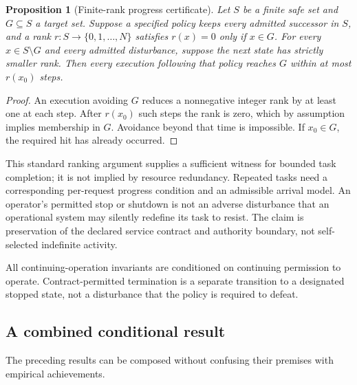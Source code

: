 \documentclass[11pt,a4paper]{article}
\newtheorem{proposition}[theorem]{Proposition}
\theoremstyle{definition}
\theoremstyle{remark}
\begin{document}
\begin{proposition}[Finite-rank progress certificate]\label{prop:progress}
Let $S$ be a finite safe set and $G\subseteq S$ a target set. Suppose a specified policy keeps every admitted successor in $S$, and a rank $r:S\to\{0,1,\ldots,N\}$ satisfies $r(x)=0$ only if $x\in G$. For every $x\in S\setminus G$ and every admitted disturbance, suppose the next state has strictly smaller rank. Then every execution following that policy reaches $G$ within at most $r(x_0)$ steps.
\end{proposition}
\begin{proof}
An execution avoiding $G$ reduces a nonnegative integer rank by at least one at each step. After $r(x_0)$ such steps the rank is zero, which by assumption implies membership in $G$. Avoidance beyond that time is impossible. If $x_0\in G$, the required hit has already occurred.
\end{proof}

This standard ranking argument supplies a sufficient witness for bounded task completion; it is not implied by resource redundancy. Repeated tasks need a corresponding per-request progress condition and an admissible arrival model. An operator's permitted stop or shutdown is not an adverse disturbance that an operational system may silently redefine its task to resist. The claim is preservation of the declared service contract and authority boundary, not self-selected indefinite activity.

All continuing-operation invariants are conditioned on continuing permission to operate. Contract-permitted termination is a separate transition to a designated stopped state, not a disturbance that the policy is required to defeat.


\Needspace{0.55\textheight}
\subsection{A combined conditional result}
The preceding results can be composed without confusing their premises with empirical achievements.
\end{document}
